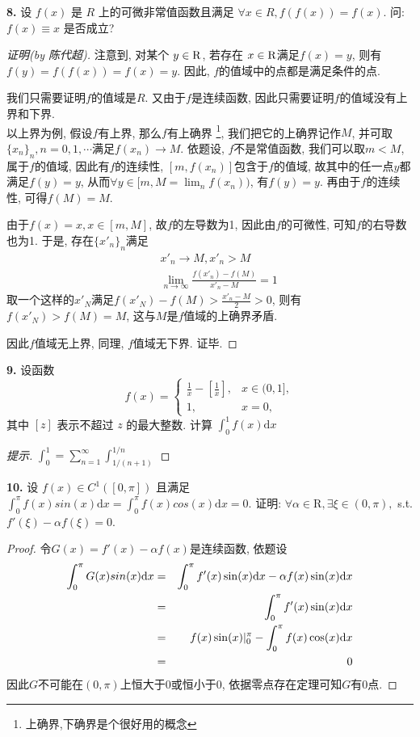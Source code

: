 \documentclass[a4paper,12pt]{article}
\begin{document}
\noindent \textbf{8.} 设 $f(x)$ 是 $R$ 上的可微非常值函数且满足 $\forall x\in R, f(f(x))=f(x)$. 
问: $f(x)\equiv x$ 是否成立?
\begin{proof}[证明(by 陈代超)]
  注意到, 对某个 $y\in \mathrm{R}$, 若存在 $x\in \mathrm{R}$满足$f(x)=y$, 
则有$f(y)=f(f(x))=f(x)=y$. 因此, $f$的值域中的点都是满足条件的点.

我们只需要证明$f$的值域是$R$.
又由于$f$是连续函数, 因此只需要证明$f$的值域没有上界和下界.\\
以上界为例, 假设$f$有上界, 那么$f$有上确界
\footnote{上确界,下确界是个很好用的概念}, 
我们把它的上确界记作$M$, 并可取$\{x_n\}_n,n=0,1,\cdots$满足$f(x_n)\to M$. 
依题设, $f$不是常值函数, 我们可以取$m<M$,
属于$f$的值域, 因此有$f$的连续性, $[m,f(x_n)]$包含于$f$的值域, 
故其中的任一点$y$都满足$f(y)=y$, 从而$\forall y\in [m,M=\lim_nf(x_n))$, 有$f(y)=y$.
再由于$f$的连续性, 可得$f(M)=M$. 

由于$f(x)=x,x\in[m,M]$, 故$f$的左导数为1, 因此由$f$的可微性, 可知$f$的右导数也为1. 
于是, 存在$\{x'_n\}_n$满足
\begin{eqnarray*}
  &&x'_n\to M, x'_n>M\\
  &&\lim_{n\to\infty}\frac{f(x'_n)-f(M)}{x'_n-M}=1
\end{eqnarray*}
取一个这样的$x'_N$满足$f(x'_N)-f(M)>\frac{x'_n-M}{2}>0$, 则有$f(x'_N)>f(M)=M$, 
这与$M$是$f$值域的上确界矛盾.

因此$f$值域无上界, 同理, $f$值域无下界. 证毕.
\end{proof}

\noindent \textbf{9.} 设函数
\[
f(x)=\left\{\begin{array}{ll}
\frac{1}{x}-[\frac{1}{x}], & x\in(0,1],\\
1,                         & x=0,
\end{array}\right.
\]
其中 $[z]$ 表示不超过 $z$ 的最大整数. 计算 $\int_0^1f(x)\mathrm{d}x$
\begin{proof}[提示]
  $\int_0^1=\sum_{n=1}^{\infty}\int_{1/(n+1)}^{1/n}$
\end{proof}

\noindent \textbf{10.} 设 $f(x)\in C^1([0,\pi])$ 且满足 
$\int_0^\pi f(x)sin(x)\mathrm{d}x=\int_0^\pi f(x)cos(x)\mathrm{d}x=0$. 证明: 
$\forall \alpha \in \mathrm{R}, \exists \xi \in (0,\pi), $ s.t. $ f'(\xi)-\alpha f(\xi)=0$.
\begin{proof}
  令$G(x)=f'(x)-\alpha f(x)$是连续函数, 依题设
\begin{eqnarray*}
  \int_0^\pi G(x)sin(x)\mathrm{d} x&=&\int_0^\pi f'(x)\sin(x)\mathrm{d} x-\alpha f(x)\sin(x)\mathrm{d} x\\
  &=&\int_0^\pi f'(x)\sin(x)\mathrm{d} x\\
  &=&f(x)\sin(x)\vert_0^\pi-\int_0^\pi f(x)\cos(x)\mathrm{d} x\\
  &=&0
\end{eqnarray*}
因此$G$不可能在$(0,\pi)$上恒大于0或恒小于0, 依据零点存在定理可知$G$有0点.
\end{proof}
\end{document}
